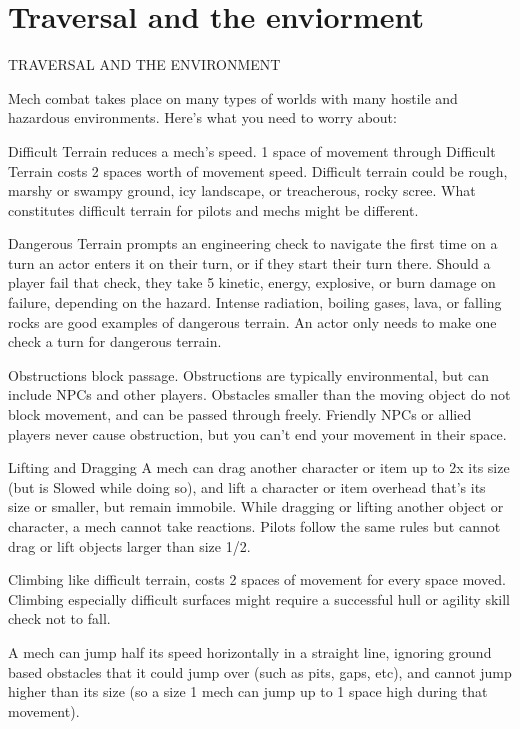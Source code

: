 \section{Traversal and the enviorment}
                          TRAVERSAL AND THE ENVIRONMENT

Mech combat takes place on many types of worlds with many hostile and hazardous
environments. Here’s what you need to worry about:





Difficult Terrain reduces a mech’s speed. 1 space of movement through Difficult Terrain costs 2
spaces worth of movement speed. Difficult terrain could be rough, marshy or swampy ground,
icy landscape, or treacherous, rocky scree. What constitutes difficult terrain for pilots and mechs
might be different.


Dangerous Terrain prompts an engineering check to navigate the first time on a turn an actor
enters it on their turn, or if they start their turn there. Should a player fail that check, they take 5
kinetic, energy, explosive, or burn damage on failure, depending on the hazard. Intense radiation,
boiling gases, lava, or falling rocks are good examples of dangerous terrain. An actor only needs
to make one check a turn for dangerous terrain.


Obstructions block passage. Obstructions are typically environmental, but can include NPCs
and other players. Obstacles smaller than the moving object do not block movement, and
can be passed through freely. Friendly NPCs or allied players never cause obstruction, but
you can’t end your movement in their space.


Lifting and  Dragging
A mech can drag another character or item up to 2x its size (but is Slowed while doing so), and
lift a character or item overhead that’s its size or smaller, but remain immobile. While dragging or
lifting another object or character, a mech cannot take reactions. Pilots follow the same rules but
cannot drag or lift objects larger than size 1/2.


Climbing like difficult terrain, costs 2 spaces of movement for every space moved. Climbing
especially difficult surfaces might require a successful hull or agility skill check not to fall.


A mech can jump half its speed horizontally in a straight line, ignoring ground based obstacles
that it could jump over (such as pits, gaps, etc), and cannot jump higher than its size (so a size 1
mech can jump up to 1 space high during that movement).



